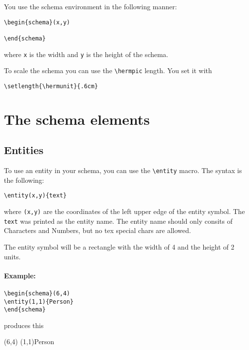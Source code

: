 \documentclass[a4paper,11pt]{article}
\begin{document}
You use the schema environment in the following manner:

\begin{verbatim}
\begin{schema}(x,y)

\end{schema}
\end{verbatim}

where {\tt x} is the width and {\tt y} is the height of 
the schema.

To scale the schema you can use the \verb|\hermpic| length.
You set it with

\begin{verbatim}
\setlength{\hermunit}{.6cm}
\end{verbatim}

\section{The schema elements}

\subsection{Entities}

To use an entity in your schema, you can use the \verb|\entity| macro.
The syntax is the following:

\begin{verbatim}
\entity(x,y){text}
\end{verbatim}

where {\tt (x,y)} are the coordinates of the left upper edge of the entity
symbol. The {\tt text} was printed as the entity name. The entity name should
only consits of Characters and Numbers, but no tex special chars are allowed.

The entity symbol will be a rectangle with the width of 4 and the height of 2 
units.

\paragraph{Example:}
\begin{verbatim}
\begin{schema}(6,4)
\entity(1,1){Person}
\end{schema}
\end{verbatim}

produces this

\begin{schema}(6,4)
\entity(1,1){Person}
\end{schema}
\end{document}
